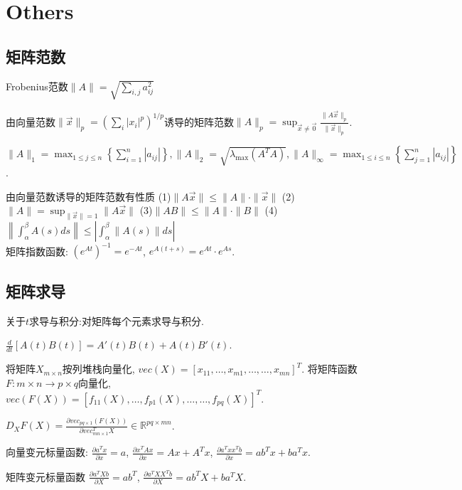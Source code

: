 \documentclass[UTF8]{ctexart}
\begin{document}
\section{Others}

\subsection{矩阵范数}

Frobenius范数$\| A\|=\sqrt{\sum_{i,j}a_{ij}^2}$

由向量范数$\| \vec{x}\| _p=(\sum _i |x_i|^p)^{1/p}$诱导的矩阵范数$\| A\|_p=\operatorname{sup}
_{\vec{x}\neq \vec{0}} \frac{\| A\vec{x} \|_p}{\| \vec{x} \|_p}$.


$\|A\|_{1}=\max _{1 \leqslant j \leqslant n}\left\{\sum_{i=1}^{n}\left|a_{i j}\right|\right\},
\|A\|_{2}=\sqrt{\lambda_{\max} \left(A^T A\right)},
\|A\|_{\infty}=\max _{1 \leqslant i \leqslant n}\left\{\sum_{j=1}^{n}\left|a_{i j}\right|\right\}$. \par 

由向量范数诱导的矩阵范数有性质
(1)$\|A \vec{x}\| \leqslant\|A\| \cdot\|\vec{x}\|$ \quad 
(2)$\|A\|=\sup _{\|\vec{x}\|=1}\|A \vec{x}\|$ \quad 
(3)$\|A B\| \leqslant\|A\| \cdot\|B\|$ \quad 
(4)$\left\|\int_{\alpha}^{\beta} A(s) d s\right\| \leqslant\left|\int_{\alpha}^{\beta}\|A(s)\| d s\right|$
~\\

矩阵指数函数: $(e^{At})^{-1}=e^{-At}$, $e^{A(t+s)}=e^{At}\cdot e^{As}$.


\subsection{矩阵求导}
关于$t$求导与积分:对矩阵每个元素求导与积分.

$\frac{d}{dt}[A(t)B(t)]=A'(t)B(t)+A(t)B'(t)$.

将矩阵$X_{m\times n}$按列堆栈向量化, $vec(X)=[x_{11},\dots,x_{m1},\dots,\dots,x_{mn}]^T$.
将矩阵函数$F:m\times n\to p\times q$向量化, $vec(F(X))=[f_{11}(X),\dots,f_{p1}(X),\dots,\dots,f_{pq}(X)]^T$.

$D_X F(X)=\frac{\partial vec_{pq\times 1}(F(X))}{\partial vec_{mn\times 1}^T X} \in \mathbb{R}^{pq\times mn}$.


向量变元标量函数:
$\frac{\partial a^Tx}{\partial x}=a$,
$\frac{\partial x^TAx}{\partial x}=Ax+A^Tx$,
$\frac{\partial a^T xx^T b}{\partial x}=ab^Tx+ba^Tx$.

矩阵变元标量函数
$\frac{\partial a^T X b}{\partial X}=ab^T$,
$\frac{\partial a^T XX^T b}{\partial X}=ab^TX+ba^TX$.
\end{document}
